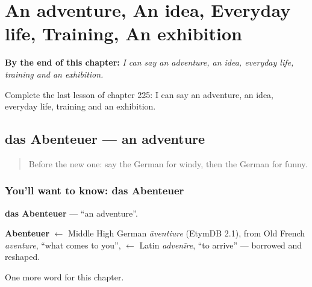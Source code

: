 
\chapter{An adventure, An idea, Everyday life, Training, An exhibition}
\label{ch:ge-an-adventure-an-idea-everyday-life-training-an-exhibition}

\begin{chapteropening}
\textbf{By the end of this chapter:} \emph{I can say an adventure, an idea, everyday life, training and an exhibition.}

Complete the last lesson of chapter 225: I can say an adventure, an idea, everyday life, training and an exhibition.
\end{chapteropening}

\section[das Abenteuer]{das Abenteuer — an adventure}

\label{lesson:GE-C225-abenteuer}



\begin{quote}
Before the new one: say the German for windy, then the German for funny.
\end{quote}

\subsection*{You'll want to know: das Abenteuer}
\textbf{das Abenteuer} — \textquotedblleft{}an adventure\textquotedblright{}.

\begin{cousinweb}
\textbf{Abenteuer} $\leftarrow$ Middle High German \emph{āventiure} (EtymDB 2.1), from Old French \emph{aventure}, \textquotedblleft{}what comes to you\textquotedblright{}, $\leftarrow$ Latin \emph{advenīre}, \textquotedblleft{}to arrive\textquotedblright{} — borrowed and reshaped.
\end{cousinweb}

\begin{grammarlens}[title={What you've built}]
One more word for this chapter.
\end{grammarlens}

